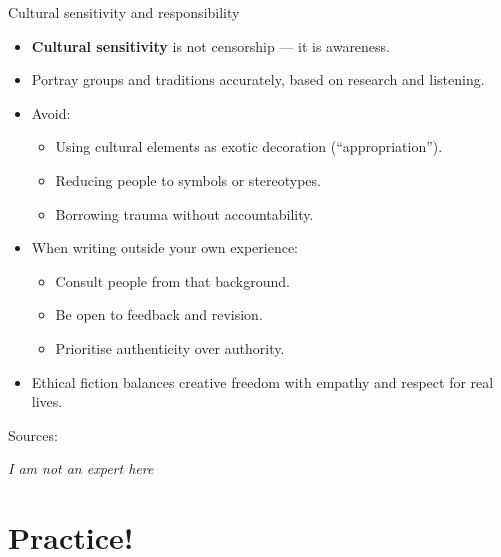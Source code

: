 \documentclass[aspectratio=169]{beamer}
\begin{document}
\begin{frame}{Cultural sensitivity and responsibility}
\begin{itemize}
  \item \textbf{Cultural sensitivity} is not censorship — it is awareness.  
  \item Portray groups and traditions accurately, based on research and listening.  
  \item Avoid:
    \begin{itemize}
      \item Using cultural elements as exotic decoration (“appropriation”).  
      \item Reducing people to symbols or stereotypes.  
      \item Borrowing trauma without accountability.  
    \end{itemize}
  \item When writing outside your own experience:
    \begin{itemize}
      \item Consult people from that background.  
      \item Be open to feedback and revision.  
      \item Prioritise authenticity over authority.
    \end{itemize}
  \item Ethical fiction balances creative freedom with empathy and respect for real lives.
\end{itemize}
\medskip
\small Sources: \citep{ocallaghan2025culturalsensitivity, maguire2009ethicsfiction, hachette2021guidediversity}

\begin{center}
\emph{I am not an expert here}  
\end{center}

\end{frame}



\section{Practice!}
\end{document}
